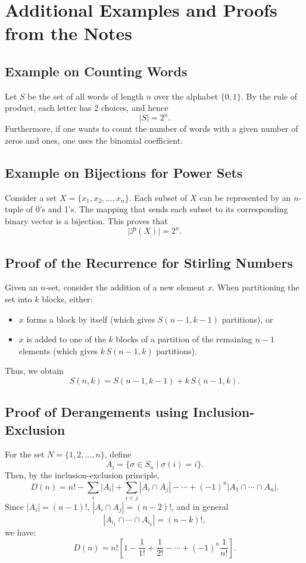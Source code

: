 \documentclass{article}
\begin{document}
\section*{Additional Examples and Proofs from the Notes}

\subsection*{Example on Counting Words}
Let $S$ be the set of all words of length $n$ over the alphabet $\{0,1\}$. By the rule of product, each letter has 2 choices, and hence
\[
|S| = 2^n.
\]
Furthermore, if one wants to count the number of words with a given number of zeros and ones, one uses the binomial coefficient.

\subsection*{Example on Bijections for Power Sets}
Consider a set $X = \{x_1, x_2, \dots, x_n\}$. Each subset of $X$ can be represented by an $n$-tuple of 0's and 1's. The mapping that sends each subset to its corresponding binary vector is a bijection. This proves that
\[
|\mathcal{P}(X)| = 2^n.
\]

\subsection*{Proof of the Recurrence for Stirling Numbers}
Given an $n$-set, consider the addition of a new element $x$. When partitioning the set into $k$ blocks, either:
\begin{itemize}[nosep]
    \item $x$ forms a block by itself (which gives $S(n-1,k-1)$ partitions), or
    \item $x$ is added to one of the $k$ blocks of a partition of the remaining $n-1$ elements (which gives $k\, S(n-1,k)$ partitions).
\end{itemize}
Thus, we obtain
\[
S(n,k) = S(n-1,k-1) + k\, S(n-1,k).
\]

\subsection*{Proof of Derangements using Inclusion-Exclusion}
For the set $N=\{1,2,\ldots,n\}$, define
\[
A_i = \{\sigma \in S_n \mid \sigma(i) = i\}.
\]
Then, by the inclusion-exclusion principle,
\[
D(n) = n! - \sum_{i} |A_i| + \sum_{i<j} |A_i \cap A_j| - \cdots + (-1)^n |A_1 \cap \cdots \cap A_n|.
\]
Since $|A_i| = (n-1)!$, $|A_i \cap A_j| = (n-2)!$, and in general
\[
|A_{i_1} \cap \cdots \cap A_{i_k}| = (n-k)!,
\]
we have:
\[
D(n) = n! \left[ 1 - \frac{1}{1!} + \frac{1}{2!} - \cdots + (-1)^n \frac{1}{n!} \right].
\]
\end{document}
